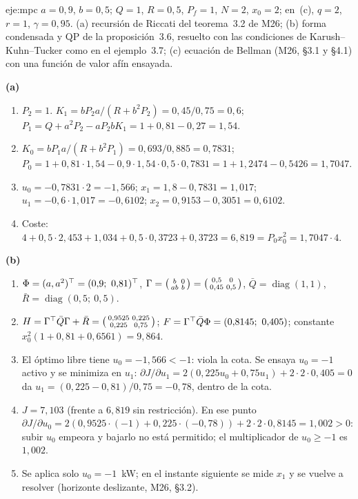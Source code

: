 \begin{solucion}{eje:mpc}
\datos $a=0{,}9$, $b=0{,}5$; $Q=1$, $R=0{,}5$, $P_f=1$, $N=2$, $x_0=2$; en~(c), $q=2$, $r=1$, $\gamma=0{,}95$.
\planteamiento (a) recursión de Riccati del teorema~3.2 de M26; (b) forma condensada y QP de la proposición~3.6, resuelto con las condiciones de Karush--Kuhn--Tucker como en el ejemplo~3.7; (c) ecuación de Bellman (M26, §3.1 y §4.1) con una función de valor afín ensayada.
\pasos

\noindent\textbf{(a)}
\begin{enumerate}[label=\arabic*.]
  \item $P_2=1$. $K_1=bP_2a/(R+b^{2}P_2)=0{,}45/0{,}75=0{,}6$; $P_1=Q+a^{2}P_2-aP_2bK_1=1+0{,}81-0{,}27=1{,}54$.
  \item $K_0=bP_1a/(R+b^{2}P_1)=0{,}693/0{,}885=0{,}7831$; $P_0=1+0{,}81\cdot 1{,}54-0{,}9\cdot 1{,}54\cdot 0{,}5\cdot 0{,}7831=1+1{,}2474-0{,}5426=1{,}7047$.
  \item $u_0=-0{,}7831\cdot 2=-1{,}566$; $x_1=1{,}8-0{,}7831=1{,}017$; $u_1=-0{,}6\cdot 1{,}017=-0{,}6102$; $x_2=0{,}9153-0{,}3051=0{,}6102$.
  \item Coste: $4+0{,}5\cdot 2{,}453+1{,}034+0{,}5\cdot 0{,}3723+0{,}3723=6{,}819=P_0x_0^{2}=1{,}7047\cdot 4$.
\end{enumerate}

\noindent\textbf{(b)}
\begin{enumerate}[label=\arabic*.]
  \item $\Phi=(a,a^{2})\T=(0{,}9;\ 0{,}81)\T$, $\Gamma=\begin{psmallmatrix}b&0\\ab&b\end{psmallmatrix}=\begin{psmallmatrix}0{,}5&0\\0{,}45&0{,}5\end{psmallmatrix}$, $\bar Q=\operatorname{diag}(1,1)$, $\bar R=\operatorname{diag}(0{,}5;\ 0{,}5)$.
  \item $H=\Gamma^{\top}\bar Q\Gamma+\bar R=\begin{psmallmatrix}0{,}9525&0{,}225\\0{,}225&0{,}75\end{psmallmatrix}$; $F=\Gamma\T\bar Q\Phi=(0{,}8145;\ 0{,}405)$; constante $x_0^{2}(1+0{,}81+0{,}6561)=9{,}864$.
  \item El óptimo libre tiene $u_0=-1{,}566<-1$: viola la cota. Se ensaya $u_0=-1$ activo y se minimiza en $u_1$: $\partial J/\partial u_1=2(0{,}225u_0+0{,}75u_1)+2\cdot 2\cdot 0{,}405=0$ da $u_1=(0{,}225-0{,}81)/0{,}75=-0{,}78$, dentro de la cota.
  \item $J=7{,}103$ (frente a $6{,}819$ sin restricción). En ese punto $\partial J/\partial u_0=2(0{,}9525\cdot(-1)+0{,}225\cdot(-0{,}78))+2\cdot 2\cdot 0{,}8145=1{,}002>0$: subir $u_0$ empeora y bajarlo no está permitido; el multiplicador de $u_0\ge-1$ es $1{,}002$.
  \item Se aplica solo $u_0=-1$~kW; en el instante siguiente se mide $x_1$ y se vuelve a resolver (horizonte deslizante, M26, §3.2).
\end{enumerate}


\end{solucion}
